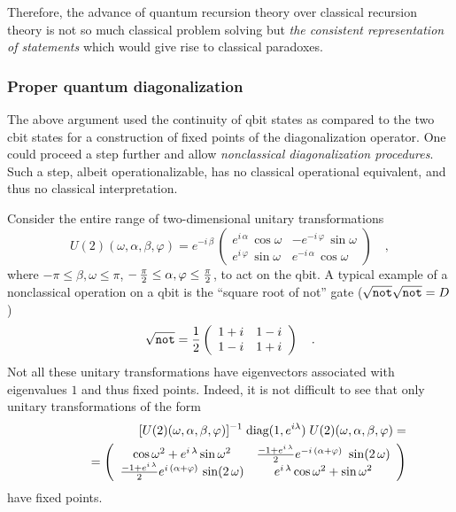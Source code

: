 Therefore, the advance of quantum recursion theory over classical
recursion theory is not so much classical problem solving but {\em the
consistent representation of statements} which would give rise to
classical paradoxes.


\subsubsection{Proper quantum diagonalization}
The above argument used the continuity of qbit states as compared to the
two cbit states for a construction of fixed points of the
diagonalization operator. One could proceed a step further and allow
{\em nonclassical diagonalization procedures}. Such a step, albeit
operationalizable, has no classical operational equivalent, and thus no
classical interpretation.

Consider the entire range of two-dimensional unitary transformations
\cite{murnaghan}
\begin{equation}
U(2)(\omega ,\alpha ,\beta ,\varphi )=e^{-i\,\beta}\,
\left(
\begin{array}{cc}
{e^{i\,\alpha }}\,\cos \omega
&
{-e^{-i\,\varphi }}\,\sin \omega
\\
{e^{i\,\varphi }}\,\sin \omega
&
{e^{-i\,\alpha }}\,\cos \omega
 \end{array}
\right)
 \quad ,
\end{equation}
where $-\pi \le \beta ,\omega \le \pi$,
$-\, {\pi \over 2} \le  \alpha ,\varphi \le {\pi \over 2}$, to act on
the qbit.
A typical example of a nonclassical operation on a qbit is
the ``square root of not'' gate
($
\sqrt{{\tt not}}
\sqrt{{\tt not}} =D$)
\begin{equation}
\sqrt{{\tt not}} =
{1 \over 2}
\left(
\begin{array}{cc}
1+i&1-i
\\
1-i&1+i
 \end{array}
\right)
\quad .
\end{equation}
Not all these unitary transformations have eigenvectors
associated with eigenvalues $1$ and thus fixed points.
Indeed, it is not difficult to see that only
unitary transformations of the form
\begin{eqnarray}
&&[U(2)(\omega ,\alpha ,\beta ,\varphi )]^{-1}\; \mbox{diag}(1,
e^{i\lambda
})\; U(2)(\omega ,\alpha ,\beta ,\varphi )= \nonumber \\
&&\qquad =\left(
\begin{array}{cc}
{{\cos \omega }^2} + {e^{i\,\lambda }}\,{{\sin \omega }^2}&
{{{
{-1 + {e^{i\,\lambda
}}\over 2}
e^{-i\,\left(\alpha +\varphi \right) }}\,
\, \sin (2\,\omega )}} \\
{ -1 + {e^{i\,\lambda }}\over 2}
 {{{e^{i\,\left(\alpha
+\varphi \right) }}\,
 \sin
(2\,\omega )}}&
{e^{i\,\lambda }}\,{{\cos \omega }^2} + {{\sin
\omega }^2}
 \end{array}
\right)
\end{eqnarray}
have fixed points.

